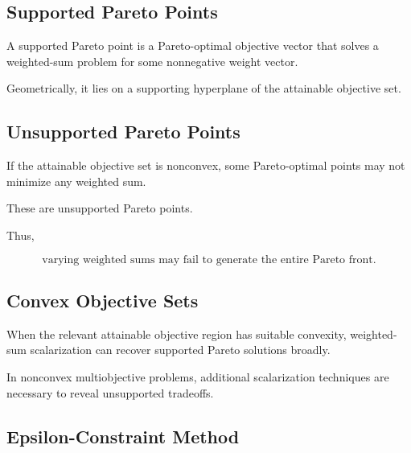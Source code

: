 \subsection{Supported Pareto Points}
\label{subsec:supported-pareto-points}

A supported Pareto point is a Pareto-optimal objective vector that solves
a weighted-sum problem for some nonnegative weight vector.

Geometrically, it lies on a supporting hyperplane of the attainable
objective set.

\subsection{Unsupported Pareto Points}
\label{subsec:unsupported-pareto-points}

If the attainable objective set is nonconvex, some Pareto-optimal points
may not minimize any weighted sum.

These are unsupported Pareto points.

Thus,

\[
\boxed{
\text{varying weighted sums may fail to generate the entire Pareto front}.
}
\]

\subsection{Convex Objective Sets}
\label{subsec:convex-objective-sets}

When the relevant attainable objective region has suitable convexity,
weighted-sum scalarization can recover supported Pareto solutions broadly.

In nonconvex multiobjective problems, additional scalarization techniques
are necessary to reveal unsupported tradeoffs.

\subsection{Epsilon-Constraint Method}
\label{subsec:epsilon-constraint-method}

